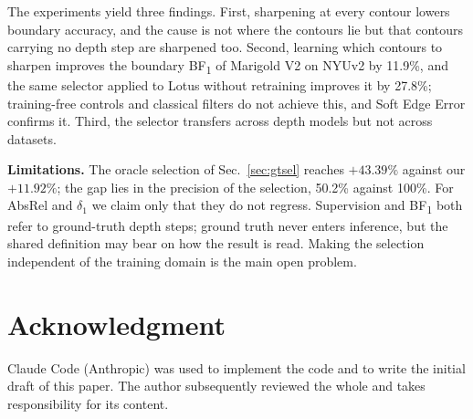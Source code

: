 \documentclass[conference]{IEEEtran}
\newcommand{\bfone}{BF\textsubscript{1}}
\begin{document}
The experiments yield three findings. First, sharpening at every contour lowers
boundary accuracy, and the cause is not where the contours lie but that contours
carrying no depth step are sharpened too. Second, learning which contours to
sharpen improves the boundary \bfone{} of Marigold V2 on NYUv2 by 11.9\%, and the
same selector applied to Lotus without retraining improves it by 27.8\%;
training-free controls and classical filters do not achieve this, and Soft Edge
Error confirms it. Third, the selector transfers across depth models but not
across datasets.

\textbf{Limitations.} The oracle selection of Sec.~\ref{sec:gtsel} reaches
$+43.39\%$ against our $+11.92\%$; the gap lies in the precision of the
selection, 50.2\% against 100\%. For AbsRel and $\delta_1$ we claim only that
they do not regress. Supervision and \bfone{} both refer to ground-truth depth
steps; ground truth never enters inference, but the shared definition may bear on
how the result is read. Making the selection independent of the training domain
is the main open problem.

\section*{Acknowledgment}

Claude Code (Anthropic) was used to implement the code and to write the initial
draft of this paper. The author subsequently reviewed the whole and takes
responsibility for its content.
\end{document}
